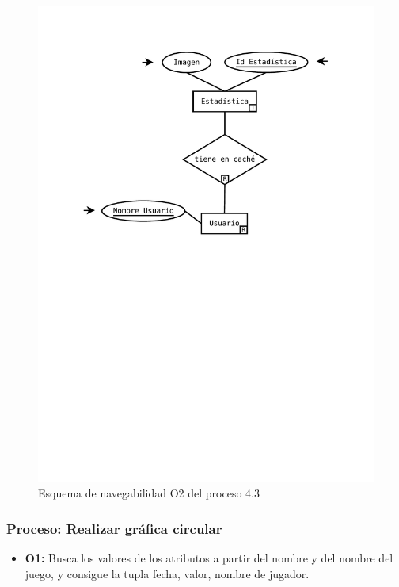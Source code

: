 \begin{figure}[H]
	\centering
	\includegraphics[width=0.5\linewidth]{../Diagramas/pdf/OpEstadisticas1-2.pdf}
	\caption{Esquema de navegabilidad  O2 del proceso 4.3}
	
	\label{fig:O4.32}
\end{figure}


\subsubsection{Proceso: Realizar gráfica circular}

\begin{itemize}
	\item \textbf{O1:} Busca los valores de los atributos a partir del nombre y del nombre del juego, y consigue la tupla fecha, valor, nombre de jugador.
\end{itemize}

